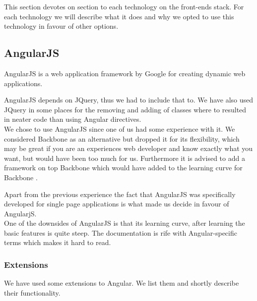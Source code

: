 This section devotes on section to each technology on the front-ends stack. For each technology we will describe what it does and why we opted to use this technology in favour of other options.

\subsection{AngularJS}
\label{ssec:1:angularjs}
	AngularJS is a web application framework by Google for creating dynamic web applications. 

	AngularJS depends on JQuery, thus we had to include that to. We have also used JQuery in some places for the removing and adding of classes where to resulted in neater code than using Angular directives.\\

	We chose to use AngularJS since one of us had some experience with it. We considered Backbone as an alternative but dropped it for its flexibility, which may be great if you are an experiences web developer and know exactly what you want, but would have been too much for us. Furthermore it is advised to add a framework on top Backbone which would have added to the learning curve for Backbone \cite{AComparisonofAngularBackboneCanJSandEmber}. 

	Apart from the previous experience the fact that AngularJS was specifically developed for single page applications is what made us decide in favour of AngularjS.\\

	One of the downsides of AngularJS is that its learning curve, after learning the basic features is quite steep. The documentation is rife with Angular-specific terms which makes it hard to read.

	\subsubsection*{Extensions}
	We have used some extensions to Angular. We list them and shortly describe their functionality.

